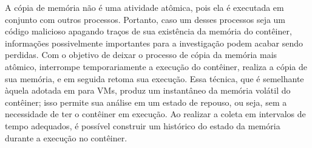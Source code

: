 A cópia de memória não é uma atividade atômica, pois ela é executada em conjunto com outros processos. 
%
Portanto, caso um desses processos seja um código malicioso apagando traços de sua existência da memória do contêiner, informações possivelmente importantes para a investigação podem acabar sendo perdidas. 
%
Com o objetivo de deixar o processo de cópia da memória mais atômico, \fancyname interrompe temporariamente a execução do contêiner, realiza a cópia de sua memória, e em seguida retoma sua execução. 
%
Essa técnica, que é semelhante àquela adotada em \cite{RafiqueStaticLiveDigitalForensics:2013} para VMs, produz um instantâneo da memória volátil do contêiner; isso permite sua análise em um estado de repouso, ou seja, sem a necessidade de ter o contêiner em execução.
%
Ao realizar a coleta em intervalos de tempo adequados, é possível construir um histórico do estado da memória durante a execução no contêiner.
%

